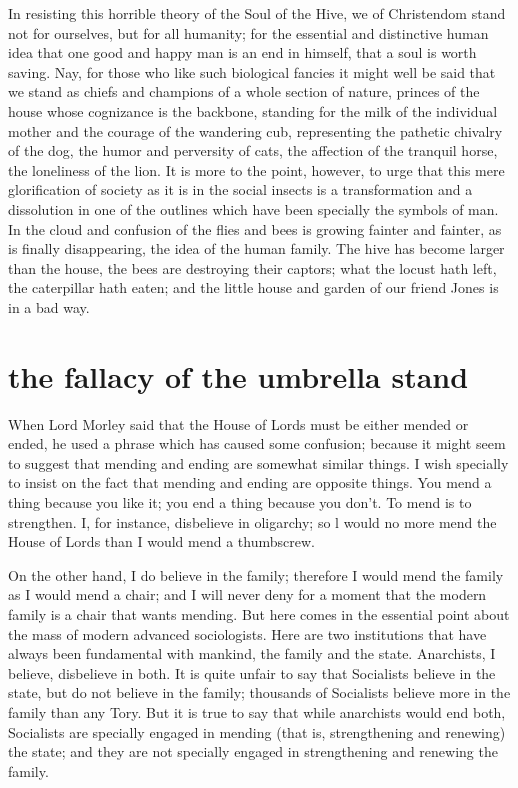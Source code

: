 \documentclass[final,10pt,letterpaper,twocolumn,openany]{book}
\begin{document}
In resisting this horrible theory of the Soul of the Hive, we of
Christendom stand not for ourselves, but for all humanity; for the essential
and distinctive human idea that one good and happy man is an end in
himself, that a soul is worth saving. Nay, for those who like such
biological fancies it might well be said that we stand as chiefs and
champions of a whole section of nature, princes of the house whose
cognizance is the backbone, standing for the milk of the individual mother
and the courage of the wandering cub, representing the pathetic chivalry of
the dog, the humor and perversity of cats, the affection of the tranquil
horse, the loneliness of the lion. It is more to the point, however, to urge
that this mere glorification of society as it is in the social insects is a
transformation and a dissolution in one of the outlines which have been
specially the symbols of man. In the cloud and confusion of the flies and
bees is growing fainter and fainter, as is finally disappearing, the idea of
the human family. The hive has become larger than the house, the bees are
destroying their captors; what the locust hath left, the caterpillar hath eaten;
and the little house and garden of our friend Jones is in a bad way.

\section{the fallacy of the umbrella stand}

    When Lord Morley said that the House of Lords must be either
mended or ended, he used a phrase which has caused some confusion;
because it might seem to suggest that mending and ending are somewhat
similar things. I wish specially to insist on the fact that mending and
ending are opposite things. You mend a thing because you like it; you end
a thing because you don't. To mend is to strengthen. I, for instance,
disbelieve in oligarchy; so l would no more mend the House of Lords than
I would mend a thumbscrew. 

On the other hand, I do believe in the family;
therefore I would mend the family as I would mend a chair; and I will
never deny for a moment that the modern family is a chair that wants
mending. But here comes in the essential point about the mass of modern
advanced sociologists. Here are two institutions that have always been
fundamental with mankind, the family and the state. Anarchists, I believe,
disbelieve in both. It is quite unfair to say that Socialists believe in the
state, but do not believe in the family; thousands of Socialists believe
more in the family than any Tory. But it is true to say that while anarchists
would end both, Socialists are specially engaged in mending (that is,
strengthening and renewing) the state; and they are not specially engaged
in strengthening and renewing the family. 
\end{document}

